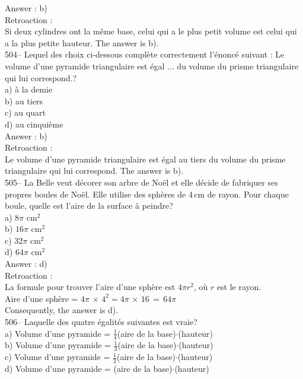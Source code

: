 ﻿\documentclass[letterpaper, 12pt]{article}
\begin{document}
Answer : b)\\

Retroaction :  \\
Si deux cylindres ont la m\^eme base, celui qui a le plus petit volume est
celui qui a la plus petite hauteur.  The answer is b).\\

504-- Lequel des choix ci-dessous compl\`ete correctement
l'\'enonc\'e suivant : \og Le volume d'une pyramide triangulaire est
\'egal  $\ldots$ du volume du prisme triangulaire qui lui correspond.\fg?\\
a) \`a la demie\\
b) au tiers\\
c) au quart\\
d) au cinqui\`eme\\

Answer : b)\\

Retroaction :  \\
Le volume d'une pyramide triangulaire est \'egal au tiers du volume du
prisme triangulaire qui lui correspond.  The answer is b).\\

505-- La Belle veut d\'ecorer son arbre de No\"el et elle d\'ecide
de fabriquer ses propres boules de No\"el.  Elle utilise des
sph\`eres de 4\,cm
de rayon.  Pour chaque boule, quelle est l'aire de la surface \`a peindre?\\
a) $8\pi$ cm$^{2}$\\
b) $16\pi$ cm$^{2}$\\
c) $32\pi$ cm$^{2}$\\
d) $64\pi$ cm$^{2}$\\

Answer : d)\\

Retroaction : \\
La formule pour trouver l'aire d'une sph\`ere est $4\pi r^{2}$, o\`u $r$ est
le rayon.  \\
Aire d'une sph\`ere = $4\pi\,\times\,4^{2}=4\pi\,\times\,16\,=\,64\pi$\\
Consequently, the answer is d).\\

506-- Laquelle des quatre \'egalit\'es suivantes est vraie?\\
a) Volume d'une pyramide = $\frac{1}{4}$(aire de la
base)$\cdot$(hauteur)\\[2mm]
b) Volume d'une pyramide = $\frac{1}{3}$(aire de la
base)$\cdot$(hauteur)\\[2mm]
c) Volume d'une pyramide = $\frac{1}{2}$(aire de la
base)$\cdot$(hauteur)\\[2mm]
d) Volume d'une pyramide = (aire de la base)$\cdot$(hauteur)\\
\end{document}
